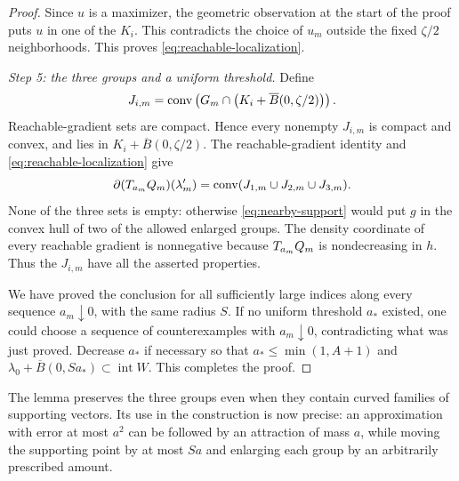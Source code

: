 \begin{proof}
Since $u$ is a maximizer, the geometric observation at the start of the proof
puts $u$ in one of the $K_i$. This contradicts the choice of $u_m$ outside
the fixed $\zeta/2$ neighborhoods. This proves
\eqref{eq:reachable-localization}.

\smallskip
\noindent\textit{Step 5: the three groups and a uniform threshold.}
Define
\[
 J_{i,m}=\operatorname{conv}\left(G_m\cap
                 \left(K_i+\overline B(0,\zeta/2)\right)\right).
\]
Reachable-gradient sets are compact. Hence every nonempty $J_{i,m}$ is
compact and convex, and lies in $K_i+\overline B(0,\zeta/2)$.
The reachable-gradient identity and
\eqref{eq:reachable-localization} give
\[
 \partial(T_{a_m}Q_m)(\lambda'_m)
       =\operatorname{conv}(J_{1,m}\cup J_{2,m}\cup J_{3,m}).
\]
None of the three sets is empty: otherwise
\eqref{eq:nearby-support} would put $g$ in the convex hull of two of the
allowed enlarged groups. The density coordinate of every reachable
gradient is nonnegative because $T_{a_m}Q_m$ is nondecreasing in $h$.
Thus the $J_{i,m}$ have all the asserted properties.

We have proved the conclusion for all sufficiently large indices along
every sequence $a_m\downarrow0$, with the same radius $S$. If no uniform
threshold $a_*$ existed, one could choose a sequence of counterexamples
with $a_m\downarrow0$, contradicting what was just proved. Decrease
$a_*$ if necessary so that $a_*\leq\min(1,A+1)$ and
$\lambda_0+\overline B(0,Sa_*)\subset\operatorname{int}W$.
This completes the proof.
\end{proof}

The lemma preserves the three groups even when they contain curved
families of supporting vectors. Its use in the construction is now
precise: an approximation with error at most $a^2$ can be followed by an
attraction of mass $a$, while moving the supporting point by at most
$Sa$ and enlarging each group by an arbitrarily prescribed amount.
